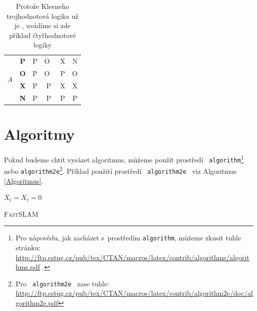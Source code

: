 \documentclass[11pt]{article}
\begin{document}
\begin{table}[h]
\begin{center}
\begin{tabular}{|c|c|c|c|c|c|}
        \multirow{4}{*}{$A$}& \textbf{P} & P & O~& X & N \\ \cline{2-6}
                            & \textbf{O} & P & O~& P & O\\ \cline{2-6}
                            & \textbf{X} & P & P & X & X\\\cline{2-6}
                            & \textbf{N} & P & P & P & P\\ \hline
    \end{tabular}
    \caption{Protože Kleeneho trojhodnotová logika už je , uvádíme si zde příklad čtyřhodnotové logiky}
    \label{tabLogiky}
\end{center}
\end{table}
\pagebreak

\section{Algoritmy}

Pokud budeme chtít vysázet algoritmus, můžeme použít prostředí \texttt{ algorithm}\footnote{Pro nápovědu, jak zacházet s~prostředím \texttt{algorithm}, můžeme zkusit tuhle stránku:\\ \href{http://ftp.cstug.cz/pub/tex/CTAN/macros/latex/contrib/algorithms/algorithms.pdf}{http://ftp.cstug.cz/pub/tex/CTAN/macros/latex/contrib/algorithms/algorithms.pdf}
.} nebo \texttt{algorithm2e}\footnote{
Pro \texttt{ algorithm2e } zase tuhle: \href{http://ftp.cstug.cz/pub/tex/CTAN/macros/latex/contrib/algorithm2e/doc/algorithm2e.pdf}{http://ftp.cstug.cz/pub/tex/CTAN/macros/latex/contrib/algorithm2e/doc/algorithm2e.pdf}}. Příklad použití prostředí \texttt{ algorithm2e } viz Algoritmus \ref{Algoritmus}. \bigskip

\begin{algorithm}[H] 
    \SetNlSty{}{}{:}
    
    \Indp
    \SetNlSkip{-1em}
    \BlankLine
    $\overline{X_t} = X_t = 0$\\
    \caption{\textsc{FastSLAM}}
    \label{Algoritmus}
\end{algorithm}
\end{document}
